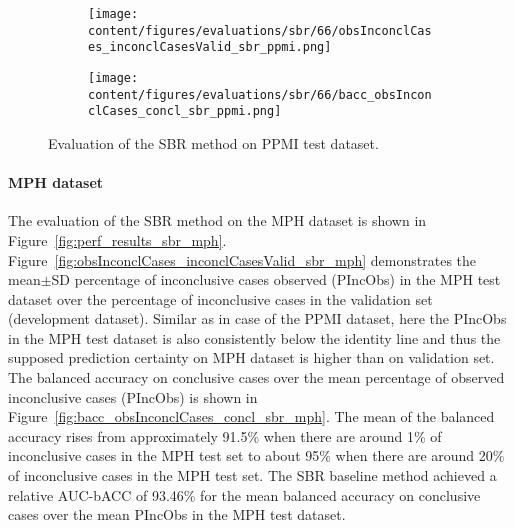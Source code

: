 \begin{figure}[ht]
  \begin{subfigure}{0.49\textwidth}
    \centering
    \texttt{[image: content/figures/evaluations/sbr/66/obsInconclCases\_inconclCasesValid\_sbr\_ppmi.png]}
    \label{fig:obsInconclCases_inconclCasesValid_sbr_ppmi}
  \end{subfigure}
  \hfill
  \begin{subfigure}{0.49\textwidth}
    \centering
    \texttt{[image: content/figures/evaluations/sbr/66/bacc\_obsInconclCases\_concl\_sbr\_ppmi.png]}
    \label{fig:bacc_obsInconclCases_concl_sbr_ppmi}
  \end{subfigure}
  \caption{Evaluation of the SBR method on PPMI test dataset.}
  \label{fig:perf_results_sbr_ppmi}
\end{figure}




\paragraph{MPH dataset}

The evaluation of the SBR method on the MPH dataset is shown in Figure~\ref{fig:perf_results_sbr_mph}.
Figure~\ref{fig:obsInconclCases_inconclCasesValid_sbr_mph} demonstrates 
the mean$\pm$SD percentage of inconclusive cases observed (PIncObs) in the MPH test dataset 
over the percentage of inconclusive cases in the validation set (development dataset).
Similar as in case of the PPMI dataset, here the PIncObs in the MPH test dataset
is also consistently below the identity line 
and thus the supposed prediction certainty on MPH dataset is higher than on validation set.
The balanced accuracy on conclusive cases over the mean percentage of observed inconclusive cases (PIncObs) is shown 
in Figure~\ref{fig:bacc_obsInconclCases_concl_sbr_mph}.
The mean of the balanced accuracy rises from approximately 91.5\% 
when there are around 1\% of inconclusive cases in the MPH test set to about 95\% 
when there are around 20\% of inconclusive cases in the MPH test set.
The SBR baseline method achieved a relative AUC-bACC of 93.46\% for the mean balanced accuracy on conclusive cases 
over the mean PIncObs in the MPH test dataset.


